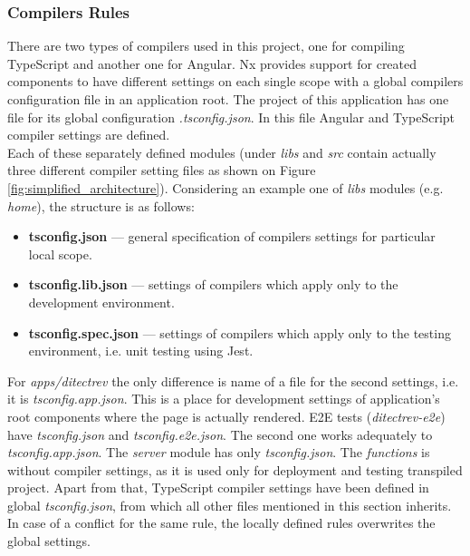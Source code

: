 \documentclass{article} %
\begin{document}
\subsubsection{Compilers Rules}
There are two types of compilers used in this project, one for compiling TypeScript and another one for Angular. Nx provides support for created components to have different settings on each single scope with a global compilers configuration file in an application root. The project of this application has one file for its global configuration \textit{.tsconfig.json}. In this file Angular and TypeScript compiler settings are defined.\\
\newline
Each of these separately defined modules (under \textit{libs} and \textit{src} contain actually three different compiler setting files as shown on Figure \ref{fig:simplified_architecture}). Considering an example one of \textit{libs} modules (e.g. \textit{home}), the structure is as follows:
\begin{itemize}
    \item \textbf{tsconfig.json} --- general specification of compilers settings for particular local scope.
    \item \textbf{tsconfig.lib.json} --- settings of compilers which apply only to the development environment. 
    \item \textbf{tsconfig.spec.json} --- settings of compilers which apply only to the testing environment, i.e. unit testing using Jest.
\end{itemize}
For \textit{apps/ditectrev} the only difference is name of a file for the second settings, i.e. it is \textit{tsconfig.app.json}. This is a place for development settings of application's root components where the page is actually rendered. E2E tests (\textit{ditectrev-e2e}) have \textit{tsconfig.json} and \textit{tsconfig.e2e.json}. The second one works adequately to \textit{tsconfig.app.json}. The \textit{server} module has only \textit{tsconfig.json}. The \textit{functions} is without compiler settings, as it is used only for deployment and testing transpiled project. Apart from that, TypeScript compiler settings have been defined in global \textit{tsconfig.json}, from which all other files mentioned in this section inherits. In case of a conflict for the same rule, the locally defined rules overwrites the global settings.\\
\end{document}
